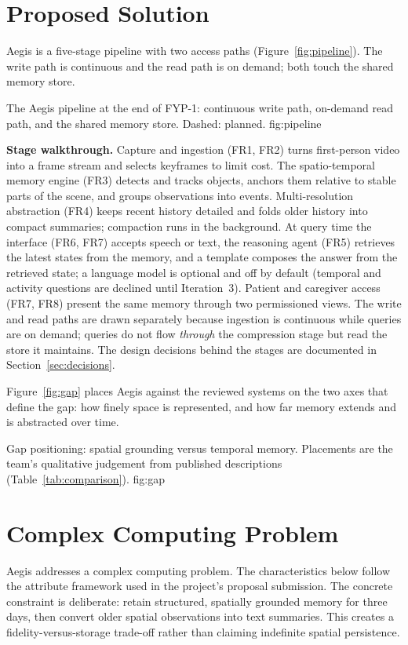 \section{Proposed Solution}
\label{sec:proposed}
Aegis is a five-stage pipeline with two access paths (Figure~\ref{fig:pipeline}).
The write path is continuous and the read path is on demand; both touch the
shared memory store.

  {The Aegis pipeline at the end of FYP-1: continuous write path, on-demand
   read path, and the shared memory store. Dashed: planned.}
  {fig:pipeline}

\textbf{Stage walkthrough.} Capture and ingestion (FR1, FR2) turns first-person
video into a frame stream and selects keyframes to limit cost. The
spatio-temporal memory engine (FR3) detects and tracks objects, anchors them
relative to stable parts of the scene, and groups observations into events.
Multi-resolution abstraction (FR4) keeps recent history detailed and folds
older history into compact summaries; compaction runs in the background. At
query time the interface (FR6, FR7) accepts speech or text, the reasoning agent
(FR5) retrieves the latest states from the memory, and a template composes
the answer from the retrieved state; a language model is optional and off by
default (temporal and activity questions are declined until Iteration~3). Patient and caregiver access (FR7, FR8) present the same
memory through two permissioned views. The write and read paths are drawn
separately because ingestion is continuous while queries are on demand;
queries do not flow \emph{through} the compression stage but read the store it
maintains. The design decisions behind the stages are documented in
Section~\ref{sec:decisions}.

Figure~\ref{fig:gap} places Aegis against the reviewed systems on the two axes
that define the gap: how finely space is represented, and how far memory
extends and is abstracted over time.

  {Gap positioning: spatial grounding versus temporal memory. Placements are
   the team's qualitative judgement from published descriptions
   (Table~\ref{tab:comparison}).}
  {fig:gap}

\section{Complex Computing Problem}
Aegis addresses a complex computing problem. The characteristics below follow
the attribute framework used in the project's proposal submission. The concrete
constraint is deliberate: retain structured, spatially grounded memory for three
days, then convert older spatial observations into text summaries. This creates a
fidelity-versus-storage trade-off rather than claiming indefinite spatial
persistence.

